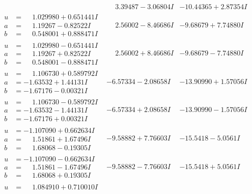 \documentclass[1p]{elsarticle_modified}
\theoremstyle{definition}
\begin{document}
$$\begin{array}{c|c|c}
 & \phantom{-}3.39487 - 3.06804 I & -10.44365 + 2.87354 I \\ \hline\begin{aligned}
u &= \phantom{-}1.029980 + 0.651441 I \\
a &= \phantom{-}1.19267 - 0.82522 I \\
b &= \phantom{-}0.548001 + 0.888471 I\end{aligned}
 & \phantom{-}2.56002 - 8.46686 I & -9.68679 + 7.74880 I \\ \hline\begin{aligned}
u &= \phantom{-}1.029980 - 0.651441 I \\
a &= \phantom{-}1.19267 + 0.82522 I \\
b &= \phantom{-}0.548001 - 0.888471 I\end{aligned}
 & \phantom{-}2.56002 + 8.46686 I & -9.68679 - 7.74880 I \\ \hline\begin{aligned}
u &= \phantom{-}1.106730 + 0.589792 I \\
a &= -1.63532 + 1.44131 I \\
b &= -1.67176 - 0.00321 I\end{aligned}
 & -6.57334 - 2.08658 I & -13.90990 + 1.57056 I \\ \hline\begin{aligned}
u &= \phantom{-}1.106730 - 0.589792 I \\
a &= -1.63532 - 1.44131 I \\
b &= -1.67176 + 0.00321 I\end{aligned}
 & -6.57334 + 2.08658 I & -13.90990 - 1.57056 I \\ \hline\begin{aligned}
u &= -1.107090 + 0.662634 I \\
a &= \phantom{-}1.51861 + 1.67496 I \\
b &= \phantom{-}1.68068 - 0.19305 I\end{aligned}
 & -9.58882 + 7.76603 I & -15.5418 - 5.0561 I \\ \hline\begin{aligned}
u &= -1.107090 - 0.662634 I \\
a &= \phantom{-}1.51861 - 1.67496 I \\
b &= \phantom{-}1.68068 + 0.19305 I\end{aligned}
 & -9.58882 - 7.76603 I & -15.5418 + 5.0561 I \\ \hline\begin{aligned}
u &= \phantom{-}1.084910 + 0.710010 I \\

\end{aligned}
\end{array}$$
\end{document}
